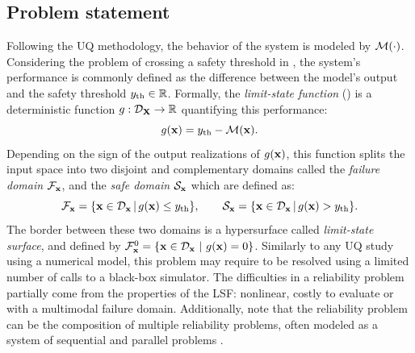 \subsection{Problem statement}

Following the UQ methodology, the behavior of the system is modeled by $\mathcal{M}(\cdot)$. 
Considering the problem of crossing a safety threshold in , the system's performance is commonly defined as the difference between the model's output and the safety threshold $y_\mathrm{th}\in\mathbb{R}$. 
Formally, the \textit{limit-state function} () is a deterministic function $g:\mathcal{D}_{{\bf X}}\rightarrow\mathbb{R}$ quantifying this performance: 
\begin{equation}
    g({\bf x}) = y_\mathrm{th} - \mathcal{M}({\bf x}).
\end{equation}
Depending on the sign of the output realizations of $g({\bf x})$, this function splits the input space into two disjoint and complementary domains called  
the \textit{failure domain} $\mathcal{F}_{{\bf x}}$, and the \textit{safe domain} $\mathcal{S}_{\bf x}$ which are defined as:
\begin{equation}
    \mathcal{F}_{{\bf x}} = \{{\bf x} \in \mathcal{D}_{\bf x} \, | \,  g({\bf x}) \leq y_\mathrm{th}\}, \qquad 
    \mathcal{S}_{\bf x} = \{{\bf x} \in \mathcal{D}_{\bf x} \, | \, g({\bf x}) > y_\mathrm{th}\}. 
\end{equation}
The border between these two domains is a hypersurface called \textit{limit-state surface}, and defined by $\mathcal{F}_{{\bf x}}^0 = \{{\bf x} \in \mathcal{D}_{\bf x} ~|~ g({\bf x}) = 0\}$. 
Similarly to any UQ study using a numerical model, this problem may require to be resolved using a limited number of calls to a black-box simulator. 
The difficulties in a reliability problem partially come from the properties of the LSF: nonlinear, costly to evaluate or with a multimodal failure domain. 
Additionally, note that the reliability problem can be the composition of multiple reliability problems, often modeled as a system of sequential and parallel problems \citep{lemaire_2009,derkiureghian_2022_book}.


